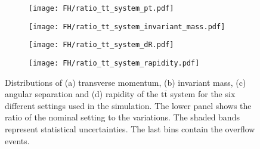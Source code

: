 \begin{figure}[H]
    \centering
    \begin{subfigure}{0.49\textwidth}
        \centering
        \texttt{[image: FH/ratio\_tt\_system\_pt.pdf]}
        \caption{}
        \label{app:subfig:pt(ttbar)_FH}
    \end{subfigure}
    \begin{subfigure}{0.49\textwidth}
        \centering
        \texttt{[image: FH/ratio\_tt\_system\_invariant\_mass.pdf]}
        \caption{}
        \label{app:subfig:m(ttbar_FH}
    \end{subfigure}

    \vspace{0.2cm}
    
    \begin{subfigure}{0.49\textwidth}
        \centering
        \texttt{[image: FH/ratio\_tt\_system\_dR.pdf]}
        \caption{}
        \label{app:subfig:dR(ttbar)_FH}
    \end{subfigure}
    \begin{subfigure}{0.49\textwidth}
        \centering
        \texttt{[image: FH/ratio\_tt\_system\_rapidity.pdf]}
        \caption{}
        \label{app:subfig:y(ttbar)_FH}
    \end{subfigure}
    \caption{Distributions of (a) transverse momentum, (b) invariant mass,  (c) angular separation and (d) rapidity of the t$\overline{\text{t}}$ system for the six different settings used in the simulation. The lower panel shows the ratio of the nominal setting to the variations. The shaded bands represent statistical uncertainties. The last bins contain the overflow events.}
    \label{app:fig:ttbar_FH}
\end{figure}


